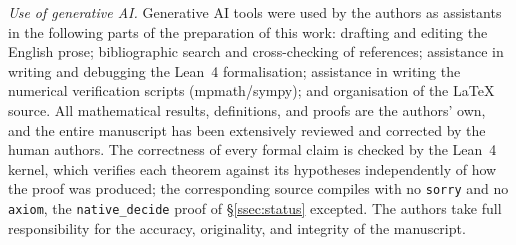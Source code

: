 \medskip
\noindent\emph{Use of generative AI.} Generative AI tools were used by the authors as
assistants in the following parts of the preparation of this work: drafting and editing
the English prose; bibliographic search and cross-checking of references; assistance in
writing and debugging the Lean~4 formalisation; assistance in writing the numerical
verification scripts (mpmath/sympy); and organisation of the \LaTeX{} source. All
mathematical results, definitions, and proofs are the authors' own, and the entire
manuscript has been extensively reviewed and corrected by the human authors. The
correctness of every formal claim is checked by the Lean~4 kernel, which verifies each
theorem against its hypotheses independently of how the proof was produced; the
corresponding source compiles with no \texttt{sorry} and no \texttt{axiom}, the
\texttt{native\_decide} proof of \S\ref{ssec:status} excepted. The authors take full
responsibility for the accuracy, originality, and integrity of the manuscript.
